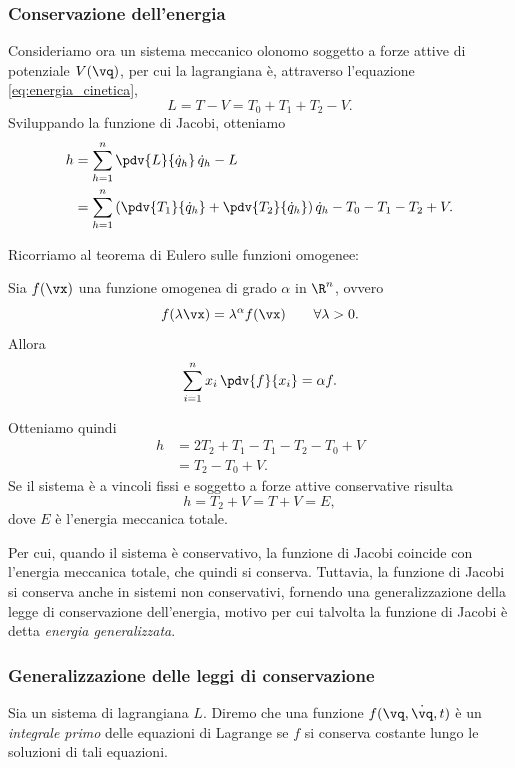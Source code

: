\subsubsection{Conservazione dell'energia}
Consideriamo ora un sistema meccanico olonomo soggetto a forze attive di potenziale $V(\vq)$, per cui la lagrangiana è, attraverso l'equazione \eqref{eq:energia_cinetica},
\begin{equation*}
    L = T - V = T_0 + T_1 + T_2- V.
\end{equation*}
Sviluppando la funzione di Jacobi, otteniamo
\begin{align*}
    h &= \sum_{h=1}^n \pdv{L}{\dot{q}_h}\,\dot{q}_h - L \\
    &= \sum_{h=1}^n \left(\pdv{T_1}{\dot{q}_h} + \pdv{T_2}{\dot{q}_h}\right)\dot{q}_h - T_0 - T_1 - T_2 + V.
\end{align*}

Ricorriamo al teorema di Eulero sulle funzioni omogenee:
\begin{theorem}
    Sia $f(\vx)$ una funzione omogenea di grado $\alpha$ in $\R^n$, ovvero
    \begin{equation*}        
        f(\lambda \vx) = \lambda^\alpha f(\vx) \qquad \forall \lambda > 0.
    \end{equation*}
    Allora
    \begin{equation*}
        \sum_{i=1}^n x_i\,\pdv{f}{x_i} = \alpha f.
    \end{equation*}
\end{theorem}

Otteniamo quindi
\begin{align*}
    h &= 2T_2 +  T_1 - T_1 - T_2 - T_0 + V \\
    &= T_2 - T_0 + V.
\end{align*}
Se il sistema è a vincoli fissi e soggetto a forze attive conservative risulta
\begin{equation*}
    h = T_2 + V = T + V  = E,
\end{equation*}
dove $E$ è l'energia meccanica totale.

Per cui, quando il sistema è conservativo, la funzione di Jacobi coincide con l'energia meccanica totale, che quindi si conserva. Tuttavia, la funzione di Jacobi si conserva anche in sistemi non conservativi, fornendo una generalizzazione della legge di conservazione dell'energia, motivo per cui talvolta la funzione di Jacobi è detta \emph{energia generalizzata}.

\subsubsection{Generalizzazione delle leggi di conservazione}
\begin{definition}
    Sia un sistema di lagrangiana $L$. Diremo che una funzione $f(\vq, \dot{\vq}, t)$ è un \emph{integrale primo} delle equazioni di Lagrange se $f$ si conserva costante lungo le soluzioni di tali equazioni.
\end{definition}

